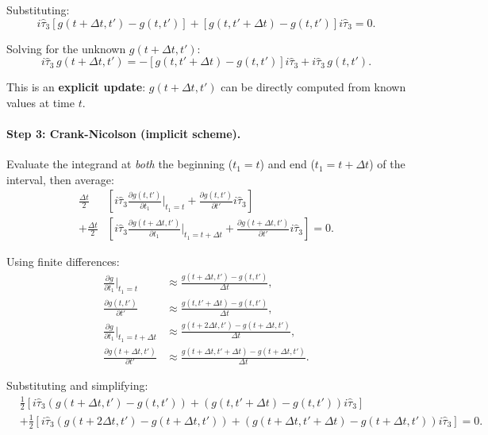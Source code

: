 \documentclass[11pt]{article}
\begin{document}
Substituting:
\begin{equation}
i\hat{\tau}_3 [g(t+\Delta t, t') - g(t, t')] + [g(t, t'+\Delta t) - g(t, t')] i\hat{\tau}_3 = 0.
\end{equation}

Solving for the unknown $g(t+\Delta t, t')$:
\begin{equation}
\boxed{i\hat{\tau}_3 \, g(t+\Delta t, t') = -[g(t, t'+\Delta t) - g(t, t')] i\hat{\tau}_3 + i\hat{\tau}_3 \, g(t, t').}
\end{equation}

This is an \textbf{explicit update}: $g(t+\Delta t, t')$ can be directly computed from known values at time $t$.

\paragraph{Step 3: Crank-Nicolson (implicit scheme).}

Evaluate the integrand at \emph{both} the beginning ($t_1 = t$) and end ($t_1 = t+\Delta t$) of the interval, then average:
\begin{equation}
\begin{split}
\frac{\Delta t}{2} &\left[i\hat{\tau}_3 \frac{\partial g(t, t')}{\partial t_1}\bigg|_{t_1=t} + \frac{\partial g(t, t')}{\partial t'} i\hat{\tau}_3\right] \\
+ \frac{\Delta t}{2} &\left[i\hat{\tau}_3 \frac{\partial g(t+\Delta t, t')}{\partial t_1}\bigg|_{t_1=t+\Delta t} + \frac{\partial g(t+\Delta t, t')}{\partial t'} i\hat{\tau}_3\right] = 0.
\end{split}
\end{equation}

Using finite differences:
\begin{align}
\frac{\partial g}{\partial t_1}\bigg|_{t_1=t} &\approx \frac{g(t+\Delta t, t') - g(t, t')}{\Delta t}, \\
\frac{\partial g(t, t')}{\partial t'} &\approx \frac{g(t, t'+\Delta t) - g(t, t')}{\Delta t}, \\
\frac{\partial g}{\partial t_1}\bigg|_{t_1=t+\Delta t} &\approx \frac{g(t+2\Delta t, t') - g(t+\Delta t, t')}{\Delta t}, \\
\frac{\partial g(t+\Delta t, t')}{\partial t'} &\approx \frac{g(t+\Delta t, t'+\Delta t) - g(t+\Delta t, t')}{\Delta t}.
\end{align}

Substituting and simplifying:
\begin{equation}
\begin{split}
&\frac{1}{2}\left[i\hat{\tau}_3 (g(t+\Delta t, t') - g(t, t')) + (g(t, t'+\Delta t) - g(t, t')) i\hat{\tau}_3\right] \\
&+ \frac{1}{2}\left[i\hat{\tau}_3 (g(t+2\Delta t, t') - g(t+\Delta t, t')) + (g(t+\Delta t, t'+\Delta t) - g(t+\Delta t, t')) i\hat{\tau}_3\right] = 0.
\end{split}
\end{equation}
\end{document}
